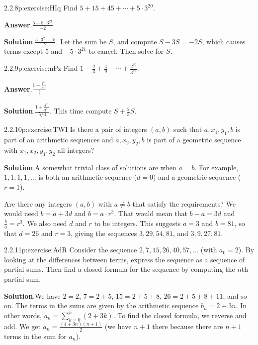 \documentclass[twoside,11pt,]{book}
\newcommand{\blocktitlefont}{\relax}
\numberwithin{equation}{chapter}
\begin{document}
\begin{divisionsolution}{2.2.8}{}{p:exercise:HIq}%
Find \(5 + 15 + 45 + \cdots + 5\cdot 3^{20}\text{.}\)%
\par\smallskip%
\noindent\textbf{\blocktitlefont Answer}.\quad{}\(\frac{5-5\cdot 3^{21}}{-2}\)%
\par\smallskip%
\noindent\textbf{\blocktitlefont Solution}.\quad{}\(\frac{5\cdot 3^{21}-5}{2}\text{.}\) Let the sum be \(S\text{,}\) and compute \(S - 3S = -2S\text{,}\) which causes terms except \(5\) and \(-5\cdot 3^{21}\) to cancel. Then solve for \(S\text{.}\)%
\end{divisionsolution}%
\begin{divisionsolution}{2.2.9}{}{p:exercise:nPz}%
Find \(1 - \frac{2}{3} + \frac{4}{9} - \cdots + \frac{2^{30}}{3^{30}}\text{.}\)%
\par\smallskip%
\noindent\textbf{\blocktitlefont Answer}.\quad{}\(\frac{1+\frac{2^{31}}{3^{31}}}{\frac{5}{3}}\)%
\par\smallskip%
\noindent\textbf{\blocktitlefont Solution}.\quad{}\(\frac{1 + \frac{2^{31}}{3^{31}}}{5/3}\text{.}\) This time compute \(S + \frac{2}{3}S\text{.}\)%
\end{divisionsolution}%
\begin{divisionsolution}{2.2.10}{}{p:exercise:TWI}%
Is there a pair of integers \((a,b)\) such that \(a,
x_1, y_1, b\) is part of an arithmetic sequences and \(a,
x_2, y_2, b\) is part of a geometric sequence with \(x_1, x_2, y_1, y_2\) all integers?%
\par\smallskip%
\noindent\textbf{\blocktitlefont Solution}.\quad{}A somewhat trivial class of solutions are when \(a = b\).  For example, \(1,1,1,1,\ldots\) is both an arithmetic sequence (\(d = 0\)) and a geometric sequence (\(r = 1\)).%
\par
Are there any integers \((a,b)\) with \(a\ne b\) that satisfy the requirements?  We would need \(b = a + 3d\) and \(b = a\cdot r^3\).  That would mean that \(b - a = 3d\) and \(\frac{b}{a} = r^3\).  We also need \(d\) and \(r\) to be integers.  This suggests \(a = 3\) and \(b = 81\), so that \(d = 26\) and \(r = 3\), giving the sequences \(3, 29, 54, 81\), and \(3, 9, 27, 81\).%
\end{divisionsolution}%
\begin{divisionsolution}{2.2.11}{}{p:exercise:AdR}%
Consider the sequence \(2, 7, 15, 26, 40, 57, \ldots\) (with \(a_0 = 2\)). By looking at the differences between terms, express the sequence as a sequence of partial sums. Then find a closed formula for the sequence by computing the \(n\)th partial sum.%
\par\smallskip%
\noindent\textbf{\blocktitlefont Solution}.\quad{}We have \(2 = 2\), \(7 = 2+5\), \(15 = 2 + 5 + 8\), \(26 = 2+5+8+11\), and so on. The terms in the sums are given by the arithmetic sequence \(b_n = 2+3n\). In other words, \(a_n = \sum_{k=0}^n (2+3k)\). To find the closed formula, we reverse and add. We get \(a_n = \frac{(4+3n)(n+1)}{2}\) (we have \(n+1\) there because there are \(n+1\) terms in the sum for \(a_n\)).%
\end{divisionsolution}%
\end{document}
